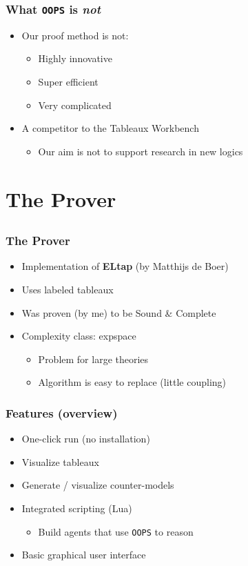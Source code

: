 \documentclass{beamer}
\begin{document}
\begin{frame}
\frametitle{What {\tt OOPS} is {\em not}}
\begin{itemize}
\item Our proof method is not:
	\begin{itemize}
	\item Highly innovative
	\item Super efficient
	\item Very complicated
	\end{itemize}
\item A competitor to the Tableaux Workbench
	\begin{itemize}
	\item Our aim is not to support research in new logics
	\end{itemize}
\end{itemize}
\end{frame}

\section{The Prover}
\subsection{}

\begin{frame}
\frametitle{The Prover}
\begin{itemize}
\item Implementation of {\bf ELtap} (by Matthijs de Boer)
\item Uses labeled tableaux
\item Was proven (by me) to be Sound \& Complete
\item Complexity class: {\sc expspace}
	\begin{itemize}
	\item Problem for large theories
	\item Algorithm is easy to replace (little coupling)
	\end{itemize}
\end{itemize}
\end{frame}

\begin{frame}
\frametitle{Features (overview)}
\begin{itemize}
\item One-click run (no installation)
\item Visualize tableaux
\item Generate / visualize counter-models
\item Integrated scripting (Lua)
	\begin{itemize}
	\item Build agents that use {\tt OOPS} to reason
	\end{itemize}
\item Basic graphical user interface
\end{itemize}
\end{frame}
\end{document}
